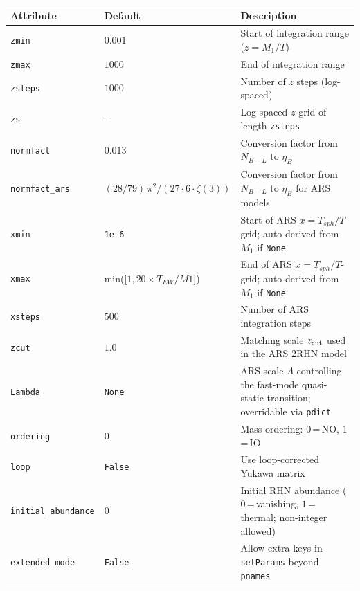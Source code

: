 \documentclass[12pt, a4paper]{article}
\begin{document}
\begin{table}[H]
\centering\small
\renewcommand{\arraystretch}{1.25}
\begin{tabular}{p{4.2cm} p{3.8cm} p{6.0cm}}
\hline
\textbf{Attribute} & \textbf{Default} & \textbf{Description} \\
\hline
\texttt{zmin}           & $0.001$                               & Start of integration range ($z=M_1/T$) \\
\texttt{zmax}           & $1000$                                & End of integration range \\
\texttt{zsteps}         & $1000$                                & Number of $z$ steps (log-spaced) \\
\texttt{zs}             & -                                 & Log-spaced $z$ grid of length \texttt{zsteps} \\
\texttt{normfact}       & $0.013$                               & Conversion factor from $N_{B-L}$ to $\eta_B$ \\
\texttt{normfact\_ars}  & $(28/79)\,\pi^2/(27{\cdot}6{\cdot}\zeta(3))$ & Conversion factor from $N_{B-L}$ to $\eta_B$ for ARS models \\
\texttt{xmin}           & \texttt{1e-6}                         & Start of ARS $x=T_{sph}/T$-grid; auto-derived from $M_1$ if \texttt{None} \\
\texttt{xmax}           & min([$1, 20 \times T_{EW}/M1$])                       & End of ARS $x=T_{sph}/T$-grid; auto-derived from $M_1$ if \texttt{None} \\
\texttt{xsteps}         & $500$                                 & Number of ARS integration steps \\
\texttt{zcut}           & $1.0$                                 & Matching scale $z_{\rm cut}$ used in the ARS 2RHN model \\
\texttt{Lambda}         & \texttt{None}                         & ARS scale $\Lambda$ controlling the fast-mode quasi-static transition; overridable via \texttt{pdict} \\
\texttt{ordering}       & $0$                                   & Mass ordering: $0$\,=\,NO, $1$\,=\,IO \\
\texttt{loop}           & \texttt{False}                        & Use loop-corrected Yukawa matrix \\
\texttt{initial\_abundance} & $0$                               & Initial RHN abundance ($0$\,=\,vanishing, $1$\,=\,thermal; non-integer allowed) \\
\texttt{extended\_mode} & \texttt{False}                        & Allow extra keys in \texttt{setParams} beyond \texttt{pnames} \\

\end{tabular}
\end{table}
\end{document}
